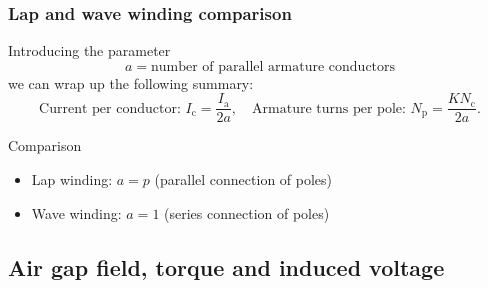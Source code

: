 \begin{frame}
	\frametitle{Lap and wave winding comparison}
	Introducing the parameter 
	\begin{equation}
		a = \mbox{number of parallel armature conductors}
		\label{eq:Parallel_conductors}
	\end{equation}
	we can wrap up the following summary:\pause
	\begin{equation}
		\mbox{Current per conductor: } I_\mathrm{c} = \frac{I_\mathrm{a}}{2 a}, \quad \mbox{Armature turns per pole: } N_\mathrm{p} = \frac{K N_\mathrm{c}}{2 a}.
	\end{equation}\pause
	\begin{varblock}{Comparison}
		\begin{itemize}
			\item Lap winding: $a = p$ (parallel connection of poles)
			\item Wave winding: $a = 1$ (series connection of poles)
		\end{itemize}
	\end{varblock}
\end{frame}

\subsection{Air gap field, torque and induced voltage}

